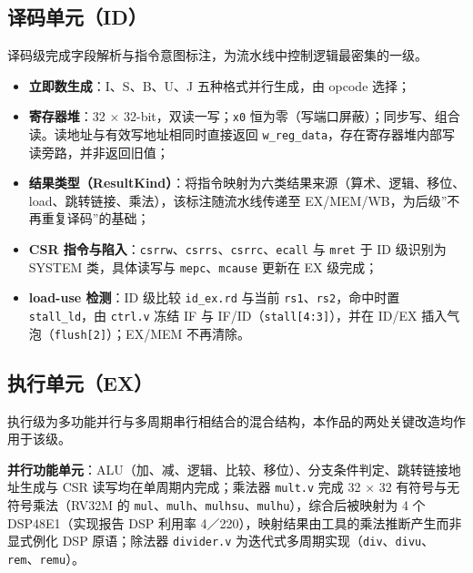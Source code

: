 
\Needspace{85pt}

\subsection{译码单元（ID）}\label{ux8bd1ux7801ux5355ux5143id}

译码级完成字段解析与指令意图标注，为流水线中控制逻辑最密集的一级。

\begin{itemize}
\tightlist
\item
  \textbf{立即数生成}：I、S、B、U、J 五种格式并行生成，由 opcode 选择；
\item
  \textbf{寄存器堆}：32 $\times$ 32-bit，双读一写；\texttt{x0} 恒为零（写端口屏蔽）；同步写、组合读。读地址与有效写地址相同时直接返回 \texttt{w\_\allowbreak{}reg\_\allowbreak{}data}，存在寄存器堆内部写读旁路，并非返回旧值；
\item
  \textbf{结果类型（ResultKind）}：将指令映射为六类结果来源（算术、逻辑、移位、load、跳转链接、乘法），该标注随流水线传递至 EX/MEM/WB，为后级''不再重复译码''的基础；
\item
  \textbf{CSR 指令与陷入}：\texttt{csrrw}、\texttt{csrrs}、\texttt{csrrc}、\texttt{ecall} 与 \texttt{mret} 于 ID 级识别为 SYSTEM 类，具体读写与 \texttt{mepc}、\texttt{mcause} 更新在 EX 级完成；
\item
  \textbf{load-use 检测}：ID 级比较 \texttt{id\_\allowbreak{}ex.\allowbreak{}rd} 与当前 \texttt{rs1}、\texttt{rs2}，命中时置 \texttt{stall\_\allowbreak{}ld}，由 \texttt{ctrl.\allowbreak{}v} 冻结 IF 与 IF/ID（\texttt{stall{[}4:3{]}}），并在 ID/EX 插入气泡（\texttt{flush{[}2{]}}）；EX/MEM 不再清除。
\end{itemize}

\Needspace{85pt}

\subsection{执行单元（EX）}

执行级为多功能并行与多周期串行相结合的混合结构，本作品的两处关键改造均作用于该级。

\textbf{并行功能单元}：ALU（加、减、逻辑、比较、移位）、分支条件判定、跳转链接地址生成与 CSR 读写均在单周期内完成；乘法器 \texttt{mult.\allowbreak{}v} 完成 32 $\times$ 32 有符号与无符号乘法（RV32M 的 \texttt{mul}、\texttt{mulh}、\texttt{mulhsu}、\texttt{mulhu}），综合后被映射为 4 个 DSP48E1（实现报告 DSP 利用率 4／220），映射结果由工具的乘法推断产生而非显式例化 DSP 原语；除法器 \texttt{divider.\allowbreak{}v} 为迭代式多周期实现（\texttt{div}、\texttt{divu}、\texttt{rem}、\texttt{remu}）。

